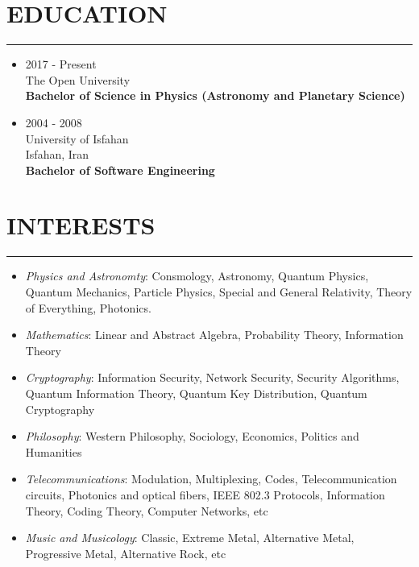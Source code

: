 \documentclass[10pt,a4paper]{article}
\begin{document}
\section{EDUCATION}
\noindent \rule {3.0cm}{0.4pt}
  \begin{itemize}
    \item \small {2017 - Present \\
                  The Open University \\
                  \textbf{Bachelor of Science in Physics (Astronomy and Planetary Science) }}
  \end{itemize}
  \begin{itemize}
    \item \small {2004 - 2008 \\
                  University of Isfahan \\
                  Isfahan, Iran \\
                  \textbf{Bachelor of Software Engineering}}
  \end{itemize}

\section{INTERESTS}
\noindent \rule {2.9cm}{0.4pt}
  \begin{itemize}
    \setlength{\rightskip}{2cm}
    \setlength\itemsep{0em}
    \item \small \textit{Physics and Astronomty}: Consmology, Astronomy, Quantum Physics, Quantum Mechanics, Particle Physics, Special and General Relativity, Theory of Everything, Photonics.
    \item \small \textit{Mathematics}: Linear and Abstract Algebra, Probability Theory, Information Theory
    \item \small \textit{Cryptography}: Information Security, Network Security, Security Algorithms, Quantum Information Theory, Quantum Key Distribution, Quantum Cryptography
    \item \small \textit{Philosophy}: Western Philosophy, Sociology, Economics, Politics and Humanities
    \item \small \textit{Telecommunications}: Modulation, Multiplexing, Codes, Telecommunication circuits, Photonics and optical fibers, IEEE 802.3 Protocols, Information Theory, Coding Theory, Computer Networks, etc
    \item \small \textit{Music and Musicology}: Classic, Extreme Metal, Alternative Metal, Progressive Metal, Alternative Rock, etc
  \end{itemize}
\end{document}
